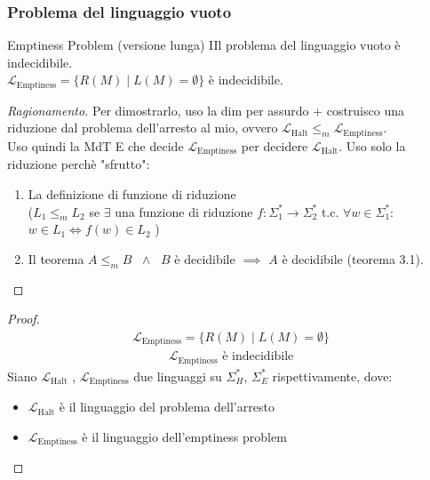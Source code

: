 \documentclass{article}  %
\theoremstyle{definition}
\newenvironment{ragionamento}[1][]
  {\begin{proof}[Ragionamento#1]\renewcommand{\qedsymbol}{}\normalfont}
  {\end{proof}}
\begin{document}
\subsubsection{Problema del linguaggio vuoto}
\begin{theorem}{Emptiness Problem (versione lunga)}
IIl problema del linguaggio vuoto è indecidibile. \\
$\mathcal{L}_{\text{Emptiness}} = \{R(M) \mid L(M)= \emptyset \}$ è indecidibile.
\footnotesize %
  \begin{ragionamento}
    Per dimostrarlo, uso la dim per assurdo + costruisco una riduzione dal problema dell'arresto al mio, ovvero 
    $\mathcal{L}_{\text{Halt}} \leq_m \mathcal{L}_{\text{Emptiness}}$. \\ Uso quindi la MdT E che decide $\mathcal{L}_{\text{Emptiness}}$ per decidere
    $\mathcal{L}_{\text{Halt}}$. Uso solo la riduzione perchè "sfrutto":
    \begin{enumerate}
      \item La definizione di funzione di riduzione\\
      ($L_1 \leq_m L_2$ se $\exists$ una funzione di riduzione $f: \Sigma_1^* \rightarrow \Sigma_2^*$ t.c. $\forall{w}\in \Sigma_1^*$: \\
      $w \in L_1 \iff f(w) \in L_2$
      )
      \item Il teorema $A \leq_m B$ $\;\wedge\;$ $B$ è decidibile $\implies$ $A$ è decidibile (teorema 3.1).
    \end{enumerate}
  \end{ragionamento}
  \begin{proof}
        \begin{align*}
      \mathcal{L}_{\text{Emptiness}} = \{R(M) \mid L(M)= \emptyset \} \tag*{(ipotesi)}
    \end{align*}
    \begin{align*}
      \mathcal{L}_{\text{Emptiness}} \text{ è indecidibile} \tag*{(tesi)}
    \end{align*}
    Siano $\mathcal{L}_{\text{Halt}}$ , $\mathcal{L}_{\text{Emptiness}}$ due linguaggi su $\Sigma_H^*$, $\Sigma_E^*$ rispettivamente, dove:
    \begin{itemize}
      \item $\mathcal{L}_{\text{Halt}}$ è il linguaggio del problema dell'arresto
      \item $\mathcal{L}_{\text{Emptiness}}$ è il linguaggio dell'emptiness problem
    \end{itemize}

\end{proof}
\end{theorem}
\end{document}
